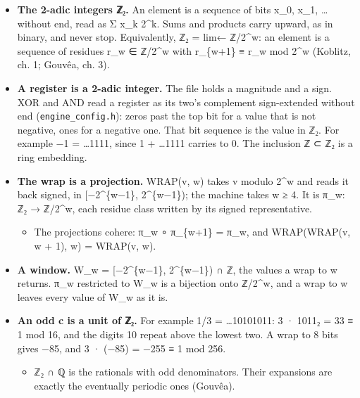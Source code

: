 \begin{itemize}
\item \textbf{The 2-adic integers ℤ₂.} An element is a sequence of bits x\_\allowbreak{}0, x\_\allowbreak{}1, … without end, read as Σ x\_\allowbreak{}k 2\textasciicircum{}k. Sums and products carry upward, as in binary, and never stop. Equivalently, ℤ₂ = lim← ℤ/2\textasciicircum{}w: an element is a sequence of residues r\_\allowbreak{}w ∈ ℤ/2\textasciicircum{}w with r\_\allowbreak{}\{w+1\} ≡ r\_\allowbreak{}w mod 2\textasciicircum{}w (Koblitz, ch. 1; Gouvêa, ch. 3).
\item \textbf{A register is a 2-adic integer.} The file holds a magnitude and a sign. XOR and AND read a register as its two's complement sign-extended without end (\texttt{engine\_\allowbreak{}config.\allowbreak{}h}): zeros past the top bit for a value that is not negative, ones for a negative one. That bit sequence is the value in ℤ₂. For example −1 = …1111, since 1 + …1111 carries to 0. The inclusion ℤ ⊂ ℤ₂ is a ring embedding.
\item \textbf{The wrap is a projection.} WRAP(v, w) takes v modulo 2\textasciicircum{}w and reads it back signed, in [−2\textasciicircum{}\{w−1\}, 2\textasciicircum{}\{w−1\}); the machine takes w ≥ 4. It is π\_\allowbreak{}w: ℤ₂ → ℤ/2\textasciicircum{}w, each residue class written by its signed representative.

\begin{itemize}
\item The projections cohere: π\_\allowbreak{}w ∘ π\_\allowbreak{}\{w+1\} = π\_\allowbreak{}w, and WRAP(WRAP(v, w + 1), w) = WRAP(v, w).
\end{itemize}
\item \textbf{A window.} W\_\allowbreak{}w = [−2\textasciicircum{}\{w−1\}, 2\textasciicircum{}\{w−1\}) ∩ ℤ, the values a wrap to w returns. π\_\allowbreak{}w restricted to W\_\allowbreak{}w is a bijection onto ℤ/2\textasciicircum{}w, and a wrap to w leaves every value of W\_\allowbreak{}w as it is.
\item \textbf{An odd c is a unit of ℤ₂.} For example 1/3 = …10101011: 3 · 1011₂ = 33 ≡ 1 mod 16, and the digits 10 repeat above the lowest two. A wrap to 8 bits gives −85, and 3 · (−85) = −255 ≡ 1 mod 256.

\begin{itemize}
\item ℤ₂ ∩ ℚ is the rationals with odd denominators. Their expansions are exactly the eventually periodic ones (Gouvêa).
\end{itemize}
\end{itemize}

